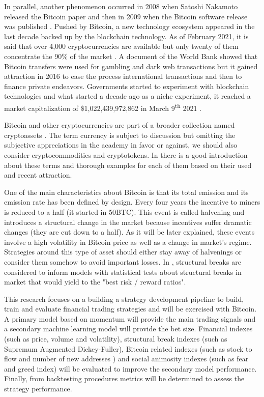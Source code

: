 In parallel, another phenomenon occurred in 2008 when Satoshi Nakamoto released the Bitcoin paper \cite{bitcoin} and then in 2009 when the Bitcoin software release was published \cite{bitcoin_release}. Pushed by Bitcoin, a new technology ecosystem appeared in the last decade backed up by the blockchain technology. As of February 2021, it is said that over 4,000 cryptocurrencies are available but only twenty of them concentrate the 90\% of the market \cite{statista_crypto}. A document of the World Bank \cite{world_bank_bitcoin} showed that Bitcoin transfers were used for gambling and dark web transactions but it gained attraction in 2016 to ease the process international transactions and then to finance private endeavors. Governments started to experiment with blockchain technologies and what started a decade ago as a niche experiment, it reached a market capitalization of \$1,022,439,972,862 in March 9\textsuperscript{th} 2021 \cite{coinmarket_market_cap_bitcoin}.

Bitcoin and other cryptocurrencies are part of a broader collection named cryptoassets \cite{cryptoassets_book}. The term currency is subject to discussion but omitting the subjective appreciations in the academy in favor or against, we should also consider cryptocommodities and cryptotokens. In \cite{cryptoassets_book} there is a good introduction about these terms and thorough examples for each of them based on their used and recent attraction.

One of the main characteristics about Bitcoin is that its total emission and its emission rate has been defined by design. Every four years the incentive to miners is reduced to a half (it started in 50BTC). This event is called halvening and introduces a structural change in the market because incentives suffer dramatic changes (they are cut down to a half). As it will be later explained, these events involve a high volatility in Bitcoin price as well as a change in market's regime. Strategies around this type of asset should either stay away of halvenings or consider them somehow to avoid important losses. In \cite{lopez_de_prado}, structural breaks are considered to inform models with statistical tests about structural breaks in market that would yield to the "best risk / reward ratios".

This research focuses on a building a strategy development pipeline to build, train and evaluate financial trading strategies and will be exercised with Bitcoin. A primary model based on momentum will provide the main trading signals and a secondary machine learning model will provide the bet size. Financial indexes (such as price, volume and volatility), structural break indexes (such as Supremum Augmented Dickey-Fuller), Bitcoin related indexes (such as stock to flow and number of new addresses ) and social animosity indexes (such as fear and greed index) will be evaluated to improve the secondary model performance. Finally, from backtesting procedures metrics will be determined to assess the strategy performance.

